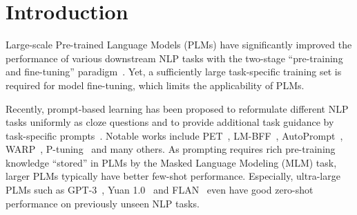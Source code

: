 \documentclass{article}
\begin{document}
\section{Introduction}

Large-scale Pre-trained Language Models (PLMs) have significantly improved the performance of various downstream NLP tasks with the two-stage ``pre-training and fine-tuning'' paradigm~\cite{DBLP:journals/corr/abs-2003-08271,DBLP:journals/corr/abs-2106-07139}. Yet, a sufficiently large task-specific training set is required for model fine-tuning, which limits the applicability of PLMs.

Recently, prompt-based learning has been proposed to reformulate different NLP tasks uniformly as cloze questions and to provide additional task guidance by task-specific prompts~\cite{DBLP:journals/corr/abs-2107-13586}.
Notable works include PET~\cite{DBLP:conf/eacl/SchickS21}, LM-BFF~\cite{DBLP:conf/acl/GaoFC20},
AutoPrompt~\cite{DBLP:conf/emnlp/ShinRLWS20}, WARP~\cite{DBLP:conf/acl/HambardzumyanKM20},
P-tuning~\cite{DBLP:journals/corr/abs-2110-07602} and many others.
As prompting requires rich pre-training knowledge ``stored'' in PLMs by the Masked Language Modeling (MLM) task, larger PLMs typically have better few-shot performance.
Especially, ultra-large PLMs such as GPT-3~\cite{DBLP:journals/corr/abs-2109-07684}, Yuan 1.0~\cite{DBLP:journals/corr/abs-2110-04725} and FLAN~\cite{DBLP:journals/corr/abs-2109-01652} even have good zero-shot performance on previously unseen NLP tasks.



\end{document}
